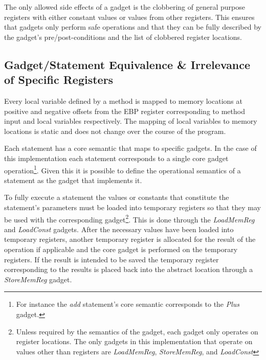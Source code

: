         The only allowed side effects of a gadget is the clobbering of
        general purpose registers with either constant values or values from
        other registers. This ensures that gadgets only perform safe
        operations and that they can be fully described by the gadget's
        pre/post-conditions and the list of clobbered register locations.


    \subsection{Gadget/Statement Equivalence \& Irrelevance of Specific Registers}

        Every local variable defined by a method is mapped to memory
        locations at positive and negative offsets from the EBP register
        corresponding to method input and local variables respectively. The
        mapping of local variables to memory locations is static and does
        not change over the course of the program.

        Each statement has a core semantic that maps to specific gadgets. In
        the case of this implementation each statement corresponds to a
        single core gadget operation\footnote{For instance the \emph{add}
        statement's core semantic corresponds to the \emph{Plus} gadget.}.
        Given this it is possible to define the operational semantics of a
        statement as the gadget that implements it.

        To fully execute a statement the values or constants that constitute
        the statement's parameters must be loaded into temporary registers so
        that they may be used with the corresponding gadget\footnote{Unless
        required by the semantics of the gadget, each gadget only operates
        on register locations. The only gadgets in this implementation that
        operate on values other than registers are \emph{LoadMemReg},
        \emph{StoreMemReg}, and \emph{LoadConst}}.  This is done through the
        \emph{LoadMemReg} and \emph{LoadConst} gadgets.  After the necessary
        values have been loaded into temporary registers, another temporary
        register is allocated for the result of the operation if applicable
        and the core gadget is performed on the temporary registers.  If the
        result is intended to be saved the temporary register corresponding
        to the results is placed back into the abstract location through a
        \emph{StoreMemReg} gadget.
        
